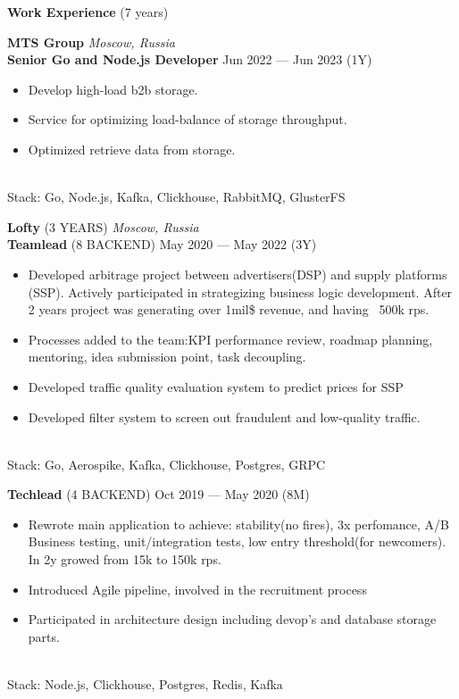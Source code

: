 \documentclass{resume} %
\begin{document}
\begin{rSection}{\textbf{Work Experience} (7 years) }

\textbf{MTS Group} \hfill \textit{Moscow, Russia} \\
\textbf{Senior Go and Node.js Developer}  \hfill Jun 2022 --- Jun 2023 (1Y)
\begin{itemize}
    \setlength\itemsep{-0.4em}
    \item Develop high-load b2b storage.
    \item Service for optimizing load-balance of storage throughput.
    \item Optimized retrieve data from storage.
\end{itemize}
\\Stack: Go, Node.js, Kafka, Clickhouse, RabbitMQ, GlusterFS

\textbf{Lofty} (3 YEARS) \hfill \textit{Moscow, Russia} \\
\textbf{Teamlead} (8 BACKEND) \hfill May 2020 --- May 2022 (3Y)
\begin{itemize}
    \setlength\itemsep{-0.4em}
    \item Developed arbitrage project between advertisers(DSP) and supply platforms (SSP). Actively participated in strategizing
    	   business logic development.
    	   After 2 years project was generating over 1mil\$ revenue, and having ~500k rps.
    \item Processes added to the team:KPI performance review, roadmap planning, mentoring, idea submission point, task decoupling.
    \item Developed traffic quality evaluation system to predict prices for SSP
    \item Developed filter system to screen out fraudulent and low-quality traffic.
\end{itemize}
\\Stack: Go, Aerospike, Kafka, Clickhouse, Postgres, GRPC

\textbf{Techlead} (4 BACKEND) \hfill Oct 2019 --- May 2020 (8M)
\begin{itemize}
    \setlength\itemsep{-0.4em}
    \item Rewrote main application to achieve: stability(no fires), 3x perfomance, A/B Business testing, unit/integration tests, low
    	    entry threshold(for newcomers).
    	    In 2y growed from 15k to 150k rps.
    \item Introduced Agile pipeline, involved in the recruitment process
    \item Participated in architecture design including devop's and database storage parts.
\end{itemize}
\\Stack: Node.js, Clickhouse, Postgres, Redis, Kafka


\end{rSection}
\end{document}
